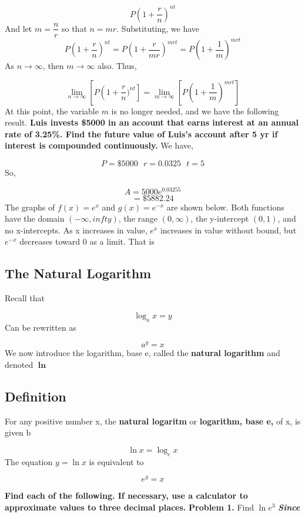 \documentclass{report}
\begin{document}
$$ P \left(1+\dfrac{r}{n}\right)^{nt}$$
And let $m = \dfrac{n}{r}$ so that $ n = mr$. Substituting, we have
$$ P \left(1+\dfrac{r}{n}\right)^{nt} = P \left(1 + \dfrac{r}{mr}\right)^{mrt} = P \left(1 + \dfrac{1}{m}\right)^{mrt}$$
\bigbreak \noindent
As $n \to\infty$, then $m \to\infty$ also. Thus,

$$ \displaystyle\lim_{n\to\infty}\left[P\left(1+\dfrac{r}{n})^{nt}\right] = \displaystyle\lim_{m\to\infty}\left[P\left(1+\dfrac{1}{m}\right)^{mrt}\right]$$
\bigbreak \noindent
\noindent At this point, the variable $m$ is no longer needed, and we have the following result.
\bigbreak \noindent
{}
\q
\bigbreak \noindent
\textbf{Luis invests \$5000 in an account that earns interest at an annual rate of 3.25\%. Find the future value of Luis's account after 5 yr if interest is compounded continuously.}
\bigbreak \noindent
We have,

$$ P = \$5000 \ \ \ r = 0.0325 \ \ \ t = 5$$
So,

$$A = 5000e^{0.0325{5}}$$
$$ = \$ 5882.24$$
\bigbreak \noindent
The graphs of $f(x) = e^x$ and $g(x) = e^{-x}$ are shown below. Both functions have the domain $(-\infty, infty)$, the range $(0,\infty)$, the y-intercept $(0,1)$, and no x-intercepts. As x increases in value, $e^x$ increases in value without bound, but $e^{-x}$ decreases toward 0 as a limit. That is
\bigbreak
\hspace{-4mm}\begin{minipage}{0.46\textwidth}
    \centering
  \end{minipage}
  \begin{minipage}{0.5\textwidth}
  \end{minipage}
  \begin{mdframed}
\subsection*{The Natural Logarithm}
\bigbreak \noindent
Recall that 

$$ \log_{a}x = y$$
Can be rewritten as

$$ a^{y} = x$$
\bigbreak \noindent \bigbreak \noindent
We now introduce the logarithm, base e, called the \textbf{natural logarithm} and denoted $\mathbf{\ln}$
\bigbreak \noindent
\subsection*{Definition}
For any positive number x, the \textbf{natural logaritm} or \textbf{logarithm, base e,} of x, is given b

$$ \ln x = \log_{e}x$$
The equation $ y=\ln x$ is equivalent to 

$$e^y = x$$
\vspace{0.5mm}
\end{mdframed}
\bigbreak \noindent
\q
\bigbreak \noindent
\textbf{Find each of the following. If necessary, use a calculator to approximate values to three decimal places.}
\bigbreak \noindent
\textbf{Problem 1.} Find $\ln e^3$
\bigbreak \noindent
\textbf{\textit{Since}}
\end{document}
